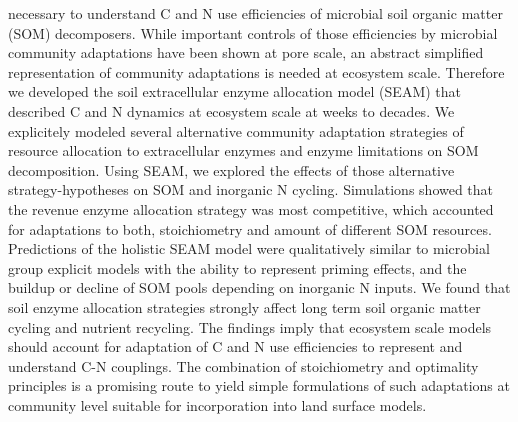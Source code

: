 necessary to understand C and N use efficiencies of microbial soil organic
matter (SOM) decomposers. While important controls of those efficiencies by
microbial community adaptations have been shown at pore scale, an abstract
simplified representation of community adaptations is needed at ecosystem scale.
Therefore we developed the soil extracellular enzyme allocation model (SEAM)
that described C and N dynamics at ecosystem scale at weeks to decades. We
explicitely modeled several alternative community adaptation strategies of
resource allocation to extracellular enzymes and enzyme limitations on SOM
decomposition. Using SEAM, we explored the effects of those alternative
strategy-hypotheses on SOM and inorganic N cycling.
Simulations showed that the revenue enzyme allocation strategy was most
competitive, which accounted for adaptations to both, stoichiometry and amount
of different SOM resources.
Predictions of the holistic SEAM model were qualitatively similar to microbial
group explicit models with the ability to represent priming effects, and the
buildup or decline of SOM pools depending on inorganic N inputs.
We found that soil enzyme allocation strategies strongly affect long term soil
organic matter cycling and nutrient recycling.
The findings imply that ecosystem scale models should account for adaptation of
C and N use efficiencies to represent and understand C-N couplings. The
combination of stoichiometry and optimality principles is a promising route to
yield simple formulations of such adaptations at community level suitable for
incorporation into land surface models.
